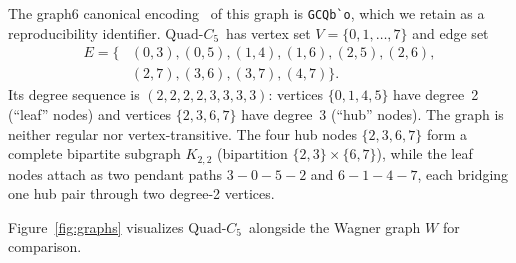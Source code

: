 \documentclass[aps,pra,twocolumn,superscriptaddress,longbibliography,floatfix]{revtex4-2}
\newcommand{\QC}{\ensuremath{\text{Quad-}C_5}}
\begin{document}
The graph6 canonical encoding~\cite{McKay2014} of this graph is
\verb|GCQb`o|, which we retain as a reproducibility identifier.
\QC\ has vertex set $V=\{0,1,\ldots,7\}$ and edge set
\begin{align}
  E = \{&(0,3),(0,5),(1,4),(1,6),(2,5),(2,6),\nonumber\\
         &(2,7),(3,6),(3,7),(4,7)\}.
  \label{eq:qc_edges}
\end{align}
Its degree sequence is $(2,2,2,2,3,3,3,3)$: vertices $\{0,1,4,5\}$ have
degree~2 (``leaf'' nodes) and vertices $\{2,3,6,7\}$ have degree~3
(``hub'' nodes).
The graph is neither regular nor vertex-transitive.
The four hub nodes $\{2,3,6,7\}$ form a complete bipartite subgraph
$K_{2,2}$ (bipartition $\{2,3\}\times\{6,7\}$), while the leaf nodes
attach as two pendant paths $3{-}0{-}5{-}2$ and $6{-}1{-}4{-}7$,
each bridging one hub pair through two degree-2 vertices.

Figure~\ref{fig:graphs} visualizes \QC\ alongside the Wagner
graph $W$ for comparison.
\end{document}
